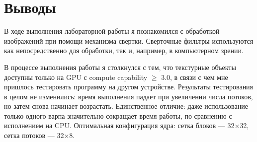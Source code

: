 \section{Выводы}
В ходе выполнения лабораторной работы я познакомился с обработкой изображений при помощи механизма свертки. Сверточные фильтры используются как непосредственно для обработки, так и, например, в компьютерном зрении.

В процессе выполнения работы я столкнулся с тем, что текстурные объекты доступны только на GPU с compute capability $\geqslant$ 3.0, в связи с чем мне пришлось тестировать программу на другом устройстве. Результаты тестирования в целом не изменились: время выполнения падает при увеличении числа потоков, но затем снова начинает возрастать. Единственное отличие: даже использование только одного варпа значительно сокращает время работы, по сравнению с исполнением на CPU. Оптимальная конфигурация ядра: сетка блоков --- 32$\times$32, сетка потоков --- 32$\times$8.
\pagebreak
